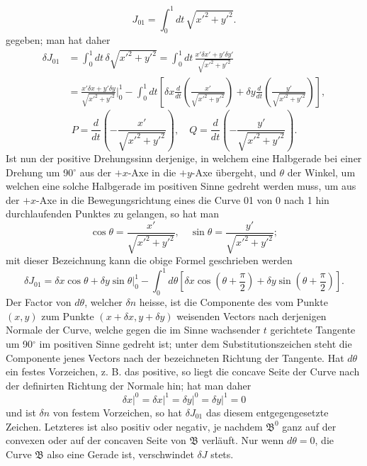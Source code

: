 \documentclass[11pt,a4paper,leqno]{article}
\begin{document}
\[
J_{01}=\int_0^1dt\,\sqrt{x'^2+y'^2}.
\]
gegeben; man hat daher
\[
\begin{aligned}
\delta J_{01}
&=\int_0^1dt\,\delta\sqrt{x'^2+y'^2}
 =\int_0^1dt\,\frac{x'\delta x'+y'\delta y'}{\sqrt{x'^2+y'^2}}\\
&=\frac{x'\delta x+y'\delta y}{\sqrt{x'^2+y'^2}}\bigg|_0^1
-\int_0^1dt\left[\delta x\frac{d}{dt}\left(\frac{x'}{\sqrt{x'^2+y'^2}}\right)+\delta y\frac{d}{dt}\left(\frac{y'}{\sqrt{x'^2+y'^2}}\right)\right],
\end{aligned}
\]
\[
P=\frac{d}{dt}\left(-\frac{x'}{\sqrt{x'^2+y'^2}}\right),\quad
Q=\frac{d}{dt}\left(-\frac{y'}{\sqrt{x'^2+y'^2}}\right).
\]
Ist nun der positive Drehungssinn derjenige, in welchem eine Halbgerade bei einer Drehung um 90\(^{\circ}\) aus der \(+x\)-Axe in die \(+y\)-Axe übergeht, und \(\theta\) der Winkel, um welchen eine solche Halbgerade im positiven Sinne gedreht werden muss, um aus der \(+x\)-Axe in die Bewegungsrichtung eines die Curve 01 von 0 nach 1 hin durchlaufenden Punktes zu gelangen, so hat man
\[
\cos\theta=\frac{x'}{\sqrt{x'^2+y'^2}},\quad \sin\theta=\frac{y'}{\sqrt{x'^2+y'^2}};
\]
mit dieser Bezeichnung kann die obige Formel geschrieben werden
\[
\delta J_{01}=\delta x\cos\theta+\delta y\sin\theta\bigg|_0^1
-\int_0^1d\theta\left[\delta x\cos\left(\theta+\frac{\pi}{2}\right)+\delta y\sin\left(\theta+\frac{\pi}{2}\right)\right].
\]
Der Factor von \(d\theta\), welcher \(\delta n\) heisse, ist die Componente des vom Punkte \((x,y)\) zum Punkte \((x+\delta x,y+\delta y)\) weisenden Vectors nach derjenigen Normale der Curve, welche gegen die im Sinne wachsender \(t\) gerichtete Tangente um 90\(^{\circ}\) im positiven Sinne gedreht ist; unter dem Substitutionszeichen steht die Componente jenes Vectors nach der bezeichneten Richtung der Tangente. Hat \(d\theta\) ein festes Vorzeichen, z. B. das positive, so liegt die concave Seite der Curve nach der definirten Richtung der Normale hin; hat man daher
\[
\delta x\big|^0=\delta x\big|^1=\delta y\big|^0=\delta y\big|^1=0
\]
und ist \(\delta n\) von festem Vorzeichen, so hat \(\delta J_{01}\) das diesem entgegengesetzte Zeichen. Letzteres ist also positiv oder negativ,
je nachdem \(\mathfrak B^0\) ganz auf der convexen oder auf der concaven Seite von \(\mathfrak B\) verläuft. Nur wenn \(d\theta=0\), die Curve \(\mathfrak B\) also eine Gerade ist, verschwindet \(\delta J\) stets.
\end{document}
